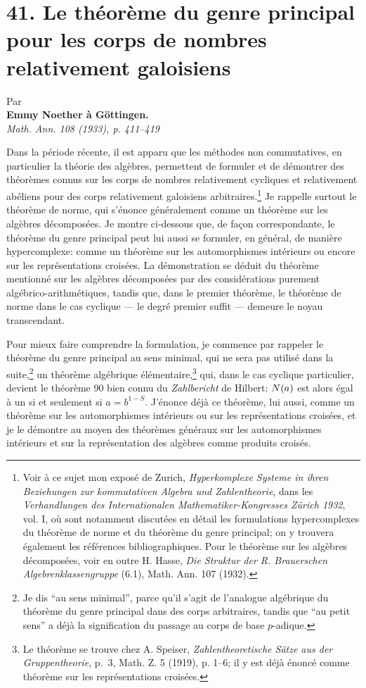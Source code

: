 \section*{41. Le théorème du genre principal pour les corps de nombres relativement galoisiens}

\begin{center}
Par\\[0.4ex]
\textbf{Emmy Noether à Göttingen.}\\[0.8ex]
\emph{Math. Ann. 108 (1933), p. 411--419}
\end{center}

Dans la période récente, il est apparu que les méthodes non commutatives, en particulier la théorie des algèbres, permettent de formuler et de démontrer des théorèmes connus sur les corps de nombres relativement cycliques et relativement abéliens pour des corps relativement galoisiens arbitraires.\footnote{Voir à ce sujet mon exposé de Zurich, \emph{Hyperkomplexe Systeme in ihren Beziehungen zur kommutativen Algebra und Zahlentheorie}, dans les \emph{Verhandlungen des Internationalen Mathematiker-Kongresses Zürich 1932}, vol. I, où sont notamment discutées en détail les formulations hypercomplexes du théorème de norme et du théorème du genre principal; on y trouvera également les références bibliographiques. Pour le théorème sur les algèbres décomposées, voir en outre H. Hasse, \emph{Die Struktur der R. Brauerschen Algebrenklassengruppe} (6.1), Math. Ann. 107 (1932).} Je rappelle surtout le théorème de norme, qui s'énonce généralement comme un théorème sur les algèbres décomposées. Je montre ci-dessous que, de façon correspondante, le théorème du genre principal peut lui aussi se formuler, en général, de manière hypercomplexe: comme un théorème sur les automorphismes intérieurs ou encore sur les représentations croisées. La démonstration se déduit du théorème mentionné sur les algèbres décomposées par des considérations purement algébrico-arithmétiques, tandis que, dans le premier théorème, le théorème de norme dans le cas cyclique --- le degré premier suffit --- demeure le noyau transcendant.

Pour mieux faire comprendre la formulation, je commence par rappeler le théorème du genre principal au sens minimal, qui ne sera pas utilisé dans la suite,\footnote{Je dis ``au sens minimal'', parce qu'il s'agit de l'analogue algébrique du théorème du genre principal dans des corps arbitraires, tandis que ``au petit sens'' a déjà la signification du passage au corps de base \(p\)-adique.} un théorème algébrique élémentaire,\footnote{Le théorème se trouve chez A. Speiser, \emph{Zahlentheoretische Sätze aus der Gruppentheorie}, p.~3, Math. Z. 5 (1919), p. 1--6; il y est déjà énoncé comme théorème sur les représentations croisées.} qui, dans le cas cyclique particulier, devient le théorème 90 bien connu du \emph{Zahlbericht} de Hilbert: \(N(a)\) est alors égal à un si et seulement si \(a=b^{1-S}\). J'énonce déjà ce théorème, lui aussi, comme un théorème sur les automorphismes intérieurs ou sur les représentations croisées, et je le démontre au moyen des théorèmes généraux sur les automorphismes intérieurs et sur la représentation des algèbres comme produits croisés.

